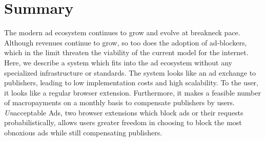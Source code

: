 \section{Summary}
The modern ad ecosystem continues to grow and evolve at breakneck pace.
Although revenues continue to grow, so too does the adoption of ad-blockers, which in the limit threaten the viability of the current model for the internet.
Here, we describe a system which fits into the ad ecosystem without any specialized infrastructure or standards.
The system looks like an ad exchange to publishers, leading to low implementation costs and high scalability.
To the user, it looks like a regular browser extension.
Furthermore, it makes a feasible number of macropayments on a monthly basis to compensate publishers by users.
\textit{Un}acceptable Ads, two browser extensions which block ads or their requests probabilistically, allows users greater freedom in choosing to block the most obnoxious ads while still compensating publishers.